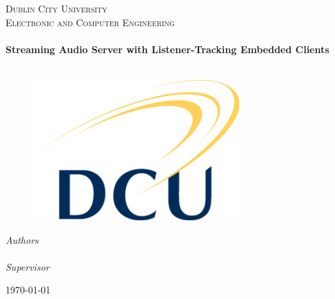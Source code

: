 \begin{titlepage}
  \begin{center}

    \textsc{\LARGE Dublin City University}\\[1.5cm]
    \textsc{\Large Electronic and Computer Engineering}\\[0.5cm]

    \HRule\\[0.4cm]
    {\huge \bfseries Streaming Audio Server with Listener-Tracking Embedded Clients\\[0.4cm]}
    \HRule\\[1.5cm]
	
    \begin{figure}[H]
	\includegraphics{images/Dcu-logo.png}
	\centering
    \end{figure}

    \emph{Authors}\\[0.1cm]
    \noindent{}\\[0.1cm]

    \emph{Supervisor}
    \noindent{}\\[1cm]

    \vfill

    {\large \today}

  \end{center}
\end{titlepage}

